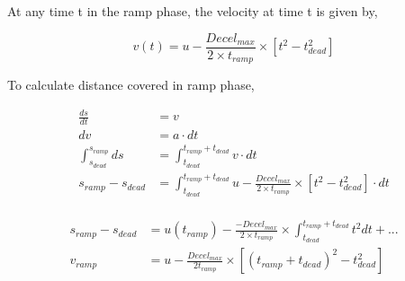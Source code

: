 \documentclass[12pt]{article}
\begin{document}
\noindent At any time t in the ramp phase, the velocity at time t is given by,

\[ v(t) = u - \frac{Decel_{max}}{2 \times t_{ramp}} \times [t^2 - t_{dead}^2] \]

\noindent To calculate distance covered in ramp phase,

\begin{equation} 
\begin{split}
\frac{ds}{dt} & = v \\
dv & = a \cdot dt \\
\int_{s_{dead}}^{s_{ramp}}{ds} &= \int_{t_{dead}}^{t_{ramp}+t_{dead}}{v \cdot dt} \\
s_{ramp} - s_{dead} &= \int_{t_{dead}}^{t_{ramp}+t_{dead}}{ u - \frac{Decel_{max}}{2 \times t_{ramp}} \times [t^2 - t_{dead}^2] \cdot dt} \\
\end{split}
\end{equation}

\begin{equation}
\begin{split}
s_{ramp} - s_{dead} &= u (t_{ramp}) - \frac{-Decel_{max}}{2 \times t_{ramp}} \times \int_{t_{dead}}^{t_{ramp}+t_{dead}}{t^2 dt} + ... \\
v_{ramp} &= u - \frac{Decel_{max}}{2t_{ramp}} \times [(t_{ramp}+t_{dead})^2 - t_{dead}^2] \\
\end{split}
\end{equation}
\end{document}

